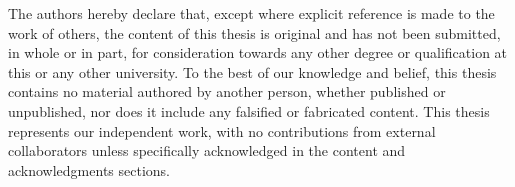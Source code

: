 
\begin{declaration}

The authors hereby declare that, except where explicit reference is made to the work of others, the content of this thesis is original and has not been submitted, in whole or in part, for consideration towards any other degree or qualification at this or any other university. To the best of our knowledge and belief, this thesis contains no material authored by another person, whether published or unpublished, nor does it include any falsified or fabricated content. This thesis represents our independent work, with no contributions from external collaborators unless specifically acknowledged in the content and acknowledgments sections.


\end{declaration}

